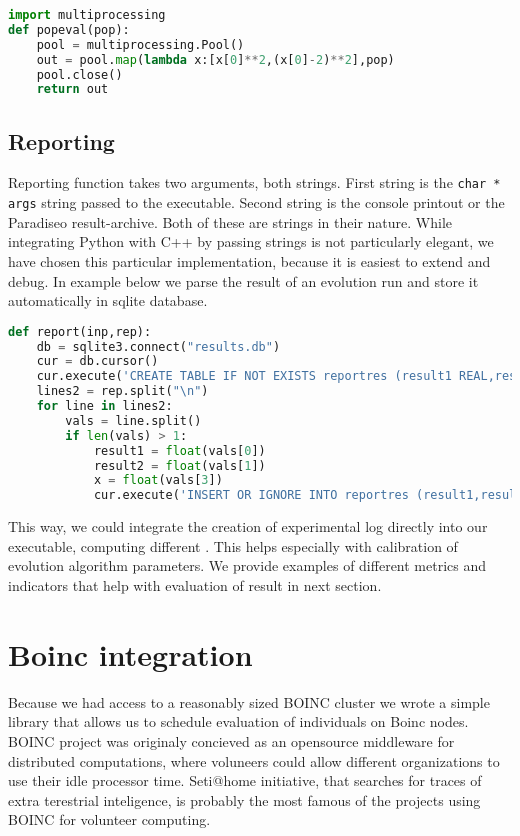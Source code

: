 \documentclass[12pt,oneside]{fithesis2}
\begin{document}
\begin{lstlisting}[language=Python,label=obj_example,caption=Evaluation]
import multiprocessing
def popeval(pop):
	pool = multiprocessing.Pool()
	out = pool.map(lambda x:[x[0]**2,(x[0]-2)**2],pop)
	pool.close()
	return out
\end{lstlisting} 

\subsection{Reporting}

Reporting function takes two arguments, both strings. First string is the \lstinline{char * args} string passed to the executable. Second string is the console printout or the Paradiseo result-archive. Both of these are strings in their nature. While integrating Python with C++ by passing strings is not particularly elegant, we have chosen this particular implementation, because it is easiest to extend and debug.  In example below we parse the result of an evolution run and store it automatically in sqlite database.

\begin{lstlisting}[language=Python,label=obj_example,caption=Evaluation]
def report(inp,rep):
    db = sqlite3.connect("results.db")
    cur = db.cursor()
    cur.execute('CREATE TABLE IF NOT EXISTS reportres (result1 REAL,result2 REAL,x REAL)')
    lines2 = rep.split("\n")
    for line in lines2:
        vals = line.split()
        if len(vals) > 1:
            result1 = float(vals[0])
            result2 = float(vals[1])
            x = float(vals[3])
            cur.execute('INSERT OR IGNORE INTO reportres (result1,result2,x) VALUES (?,?,?)',(result1,result2,x))
\end{lstlisting}

This way, we could integrate the creation of experimental log directly into our executable, computing different . This helps especially with calibration of evolution algorithm parameters.
We provide examples of different metrics and indicators that help with evaluation of result in next section.


\section{Boinc integration}

Because we had access to a reasonably sized BOINC cluster we wrote a simple library that allows us to schedule evaluation of individuals on Boinc nodes.
BOINC project was originaly concieved as an opensource middleware for distributed computations, where voluneers could allow different organizations to use their idle processor time.
Seti@home initiative, that searches for traces of extra terestrial inteligence, is probably the most famous of the projects using BOINC for volunteer computing. 
\end{document}
